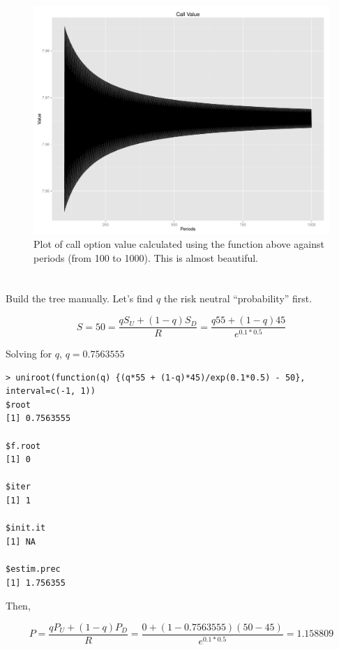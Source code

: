 \documentclass[11pt]{scrartcl}
\begin{document}
\begin{landscape}
\begin{figure}[H]
\centering\includegraphics[width=1.15\textwidth]{./hw6/problem3-1000.pdf}
\caption{Plot of call option value calculated using the function above against periods (from 100 to 1000). This is almost beautiful.}
\end{figure}
\end{landscape}

\section{}

Build the tree manually. Let's find $q$ the risk neutral ``probability'' first.

\[S = 50 = \frac{qS_U + (1-q)S_D}{R} = \frac{q55 + (1-q)45}{e^{0.1*0.5}}\]

Solving for $q$, $q = 0.7563555$

\begin{lstlisting}
> uniroot(function(q) {(q*55 + (1-q)*45)/exp(0.1*0.5) - 50}, interval=c(-1, 1))
$root
[1] 0.7563555

$f.root
[1] 0

$iter
[1] 1

$init.it
[1] NA

$estim.prec
[1] 1.756355
\end{lstlisting}

Then,

\[P = \frac{qP_U + (1-q)P_D}{R} = \frac{0 + (1-0.7563555)(50-45)}{e^{0.1*0.5}} = 1.158809\]
\end{document}
